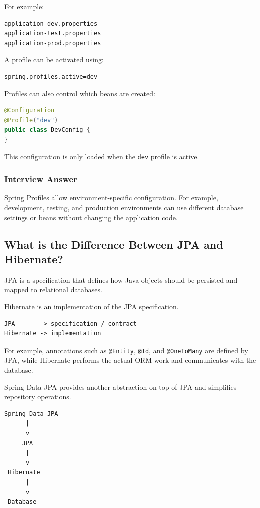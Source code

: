 \documentclass[12pt,a4paper]{article}
\begin{document}
For example:

\begin{verbatim}
application-dev.properties
application-test.properties
application-prod.properties
\end{verbatim}

A profile can be activated using:

\begin{verbatim}
spring.profiles.active=dev
\end{verbatim}

Profiles can also control which beans are created:

\begin{lstlisting}[language=Java]
@Configuration
@Profile("dev")
public class DevConfig {
}
\end{lstlisting}

This configuration is only loaded when the \texttt{dev} profile is active.

\subsubsection*{Interview Answer}

Spring Profiles allow environment-specific configuration. For example,
development, testing, and production environments can use different
database settings or beans without changing the application code.

\subsection{What is the Difference Between JPA and Hibernate?}

JPA is a specification that defines how Java objects should be persisted
and mapped to relational databases.

Hibernate is an implementation of the JPA specification.

\begin{verbatim}
JPA       -> specification / contract
Hibernate -> implementation
\end{verbatim}

For example, annotations such as \texttt{@Entity}, \texttt{@Id}, and
\texttt{@OneToMany} are defined by JPA, while Hibernate performs the actual
ORM work and communicates with the database.

Spring Data JPA provides another abstraction on top of JPA and simplifies
repository operations.

\begin{verbatim}
Spring Data JPA
      |
      v
     JPA
      |
      v
 Hibernate
      |
      v
 Database
\end{verbatim}
\end{document}
